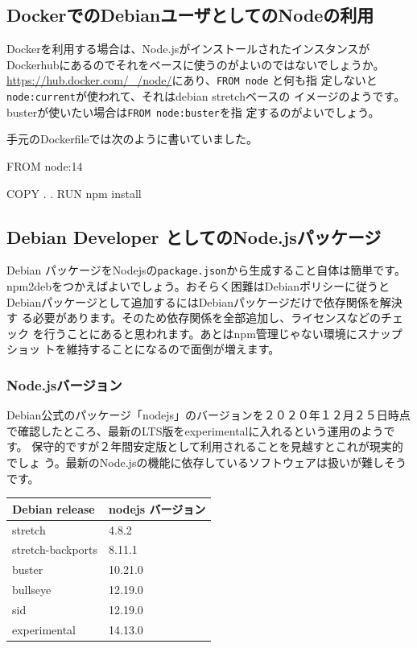 \documentclass[mingoth,a4paper]{jsarticle}
\begin{document}
\subsection{DockerでのDebianユーザとしてのNodeの利用}

Dockerを利用する場合は、Node.jsがインストールされたインスタンスが
Dockerhubにあるのでそれをベースに使うのがよいのではないでしょうか。
\url{https://hub.docker.com/_/node/}にあり、\texttt{FROM node} と何も指
定しないと\texttt{node:current}が使われて、それはdebian stretchベースの
イメージのようです。busterが使いたい場合は\texttt{FROM node:buster}を指
定するのがよいでしょう。

手元のDockerfileでは次のように書いていました。

\begin{commandline}
FROM node:14

COPY . .
RUN npm install
\end{commandline}

\subsection{Debian Developer としてのNode.jsパッケージ}

Debian パッケージをNodejsの\texttt{package.json}から生成すること自体は簡単です。
npm2debをつかえばよいでしょう。おそらく困難はDebianポリシーに従うと
Debianパッケージとして追加するにはDebianパッケージだけで依存関係を解決す
る必要があります。そのため依存関係を全部追加し、ライセンスなどのチェック
を行うことにあると思われます。あとはnpm管理じゃない環境にスナップショッ
トを維持することになるので面倒が増えます。

\subsubsection{Node.jsバージョン}

Debian公式のパッケージ「nodejs」のバージョンを２０２０年１２月２５日時点
で確認したところ、最新のLTS版をexperimentalに入れるという運用のようです。
保守的ですが２年間安定版として利用されることを見越すとこれが現実的でしょ
う。最新のNode.jsの機能に依存しているソフトウェアは扱いが難しそうです。

\begin{tabular}{|l|l|}
Debian release    & nodejs バージョン \\
\hline
stretch           & 4.8.2 \\
stretch-backports & 8.11.1 \\
buster            & 10.21.0 \\
bullseye          & 12.19.0 \\
sid               & 12.19.0 \\
experimental      & 14.13.0 \\
\end{tabular}
\end{document}
